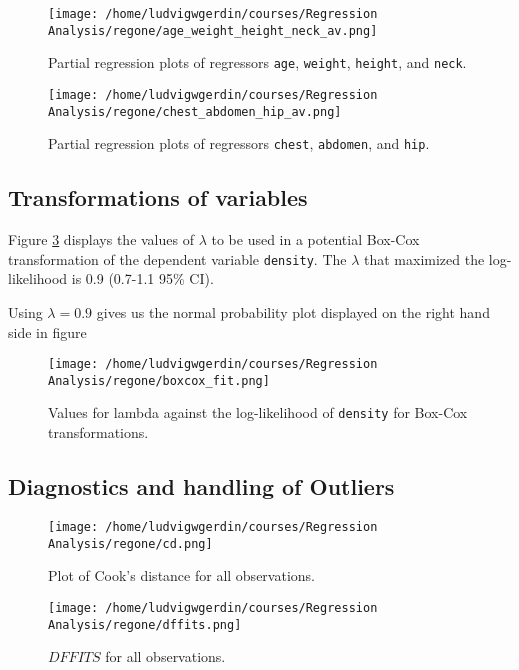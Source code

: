 \documentclass[11pt]{article}
\begin{document}
\begin{figure}[htbp]
\centering
\texttt{[image: /home/ludvigwgerdin/courses/Regression Analysis/regone/age\_weight\_height\_neck\_av.png]}
\caption{\label{fig:org729bd54}
Partial regression plots of regressors \texttt{age}, \texttt{weight}, \texttt{height}, and \texttt{neck}.}
\end{figure}

\begin{figure}[htbp]
\centering
\texttt{[image: /home/ludvigwgerdin/courses/Regression Analysis/regone/chest\_abdomen\_hip\_av.png]}
\caption{\label{fig:orgce456d6}
Partial regression plots of regressors \texttt{chest}, \texttt{abdomen}, and \texttt{hip}.}
\end{figure}
\subsection{Transformations of variables}
\label{sec:org5cc36e4}

Figure \ref{fig:org7c6bc26} displays the values of \(\lambda\) to be used in a potential Box-Cox transformation of 
the dependent variable \texttt{density}. The \(\lambda\) that maximized the log-likelihood is 0.9 (0.7-1.1 95\% CI). 

Using \(\lambda = 0.9\) gives us the normal probability plot displayed on the right hand side in figure

\begin{figure}[h]
\centering
\texttt{[image: /home/ludvigwgerdin/courses/Regression Analysis/regone/boxcox\_fit.png]}
\caption{\label{fig:org7c6bc26}
Values for lambda against the log-likelihood of \texttt{density} for Box-Cox transformations.}
\end{figure}

\subsection{Diagnostics and handling of Outliers}
\label{sec:orgba54b0b}

\begin{figure}[h]
\centering
\texttt{[image: /home/ludvigwgerdin/courses/Regression Analysis/regone/cd.png]}
\caption{\label{fig:org6ebf2b4}
Plot of Cook's distance for all observations.}
\end{figure}

\begin{figure}[h]
\centering
\texttt{[image: /home/ludvigwgerdin/courses/Regression Analysis/regone/dffits.png]}
\caption{\label{fig:org5375fd2}
\(DFFITS\) for all observations.}
\end{figure}
\end{document}
